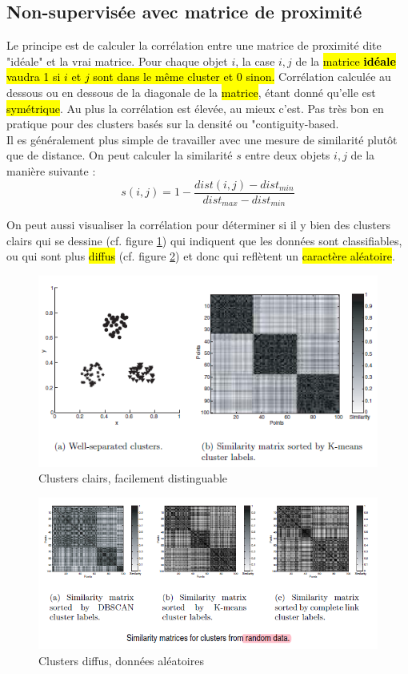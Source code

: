 \documentclass[letterpaper, 12pt]{article}
\newcommand{\alinea}{
\hspace*{0.5cm}}
\begin{document}
		\subsection{Non-supervisée avec matrice de proximité}
			\alinea Le principe est de calculer la corrélation entre
				une matrice de proximité dite "idéale" et la vrai matrice.
				Pour chaque objet $i$, la case $i, j$ de la \hl{matrice
				\textbf{idéale} vaudra 1 si $i$ et $j$ sont dans le
				même cluster et 0 sinon.} Corrélation calculée au 
				dessous ou en dessous de la diagonale de la \hl{matrice},
				étant donné qu'elle est \hl{symétrique}. Au plus la
				corrélation est élevée, au mieux c'est. Pas très 
				bon en pratique pour des clusters basés sur la densité 
				ou "contiguity-based.\\
			\alinea Il es généralement plus simple de travailler avec
				une mesure de similarité plutôt que de distance.
				On peut calculer la similarité $s$ entre deux 
				objets $i, j$ de la manière suivante :
				$$ s(i, j) = 1-\frac{dist(i, j) - dist_{min}}%
				{dist_{max} - dist_{min}} $$
			\alinea On peut aussi visualiser la corrélation pour déterminer
				si il y bien des clusters clairs qui se dessine (cf. 
				figure \ref{fig:clustering:correl1}) qui indiquent
				que les données sont classifiables, ou qui sont
				plus \hl{diffus} (cf. figure \ref{fig:clustering:correl2})
				et donc qui reflètent un \hl{caractère aléatoire}.
			\begin{figure}[H]
				\centering
				\includegraphics[scale=0.75]{Images/correl_1}
				\caption{Clusters clairs, facilement distinguable}
				\label{fig:clustering:correl1}
			\end{figure}\noindent
			\begin{figure}[H]
				\centering
				\includegraphics[scale=0.75]{Images/correl_2}
				\caption{Clusters diffus, données aléatoires}
				\label{fig:clustering:correl2}
			\end{figure}\noindent
\end{document}
